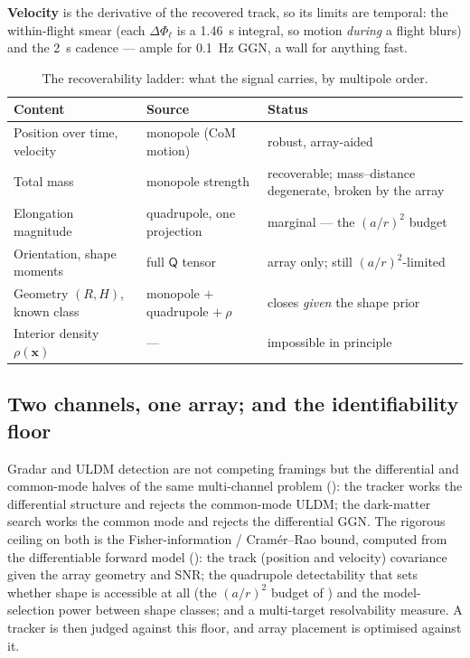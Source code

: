 \documentclass[11pt,a4paper]{article}
\theoremstyle{reqstyle}
\newcommand{\xv}{\mathbf{x}}
\begin{document}
\textbf{Velocity} is the derivative of the recovered track, so its limits are temporal: the
within-flight smear (each $\Delta\Phi_\ell$ is a \SI{1.46}{\second} integral, so motion
\emph{during} a flight blurs) and the \SI{2}{\second} cadence --- ample for \SI{0.1}{\hertz}
GGN, a wall for anything fast.

\begin{table}[h]
\centering
\caption{The recoverability ladder: what the signal carries, by multipole order.}
\label{tab:identifiability}
\small
\begin{tabular}{@{}p{}p{}p{}@{}}
\toprule
Content & Source & Status \\
\midrule
Position over time, velocity & monopole (CoM motion) & robust, array-aided \\
Total mass & monopole strength & recoverable; mass--distance degenerate, broken by the array \\
Elongation magnitude & quadrupole, one projection & marginal --- the $(a/r)^2$ budget \\
Orientation, shape moments & full $\mathsf{Q}$ tensor & array only; still $(a/r)^2$-limited \\
Geometry $(R,H)$, known class & monopole $+$ quadrupole $+\ \rho$ & closes \emph{given} the shape prior \\
Interior density $\rho(\xv)$ & --- & impossible in principle \\
\bottomrule
\end{tabular}
\end{table}

\subsection{Two channels, one array; and the identifiability floor}
Gradar and ULDM detection are not competing framings but the differential and
common-mode halves of the same multi-channel problem (): the tracker works the
differential structure and rejects the common-mode ULDM; the dark-matter search works the
common mode and rejects the differential GGN. The rigorous ceiling on both is the
Fisher-information / Cram\'er--Rao bound, computed from the differentiable forward model
(): the track (position and velocity) covariance given the array geometry and
SNR; the quadrupole detectability that sets whether shape is accessible at all (the $(a/r)^2$
budget of ) and the model-selection power between shape classes; and a
multi-target resolvability measure. A tracker is then judged against this floor, and array
placement is optimised against it.
\end{document}
